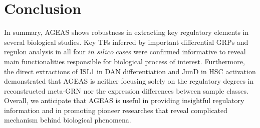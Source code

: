 \documentclass[fleqn,10pt]{wlscirep}
\begin{document}

\section*{Conclusion}
  In summary, AGEAS shows robustness in extracting key regulatory elements in several biological studies.
  Key TFs inferred by important differential GRPs and regulon analysis in all four $in$ $silico$ cases were confirmed informative to reveal main functionalities responsible for biological process of interest.
  Furthermore, the direct extractions of ISL1 in DAN differentiation and JunD in HSC activation demonstrated that AGEAS is neither focusing solely on the regulatory degrees in reconstructed meta-GRN nor the expression differences between sample classes.
  Overall, we anticipate that AGEAS is useful in providing insightful regulatory information and in promoting pioneer researches that reveal complicated mechanism behind biological phenomena.
\end{document}

